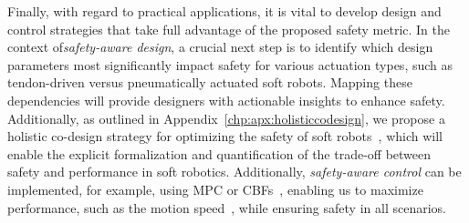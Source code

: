 Finally, with regard to practical applications, it is vital to develop design and control strategies that take full advantage of the proposed safety metric. In the context of\emph{safety-aware design}, a crucial next step is to identify which design parameters most significantly impact safety for various actuation types, such as tendon-driven versus pneumatically actuated soft robots. Mapping these dependencies will provide designers with actionable insights to enhance safety. Additionally, as outlined in Appendix~\ref{chp:apx:holisticcodesign}, we propose a holistic co-design strategy for optimizing the safety of soft robots~\citep{zardini2023co, spielberg2019learning, wang2024diffusebot, navez2024contributions}, which will enable the explicit formalization and quantification of the trade-off between safety and performance in soft robotics.
Additionally, \emph{safety-aware control} can be implemented, for example, using \gls{MPC} or \glspl{CBF}~\citep{ames2016control, ferraguti2020control}, enabling us to maximize performance, such as the motion speed~\citep{haggerty2023control}, while ensuring safety in all scenarios.